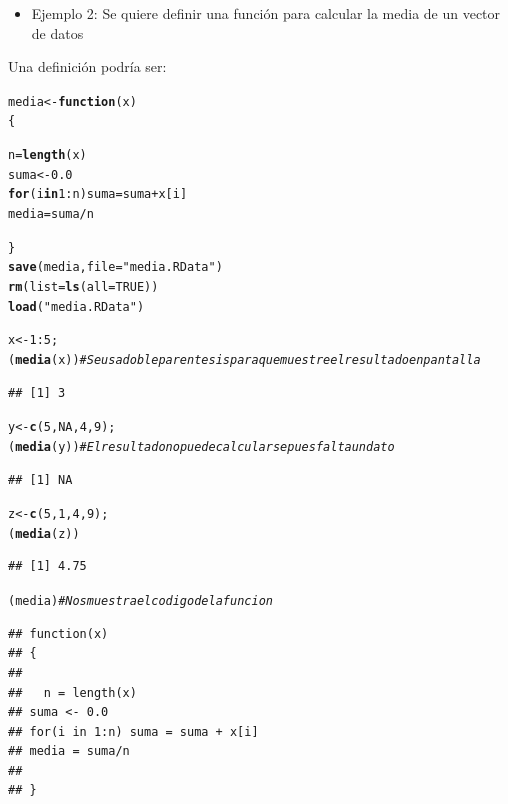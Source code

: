 \documentclass[12pt,letterpaper]{article}\usepackage[]{graphicx}\usepackage[]{color}
\makeatletter
\newcommand{\hlnum}[1]{\textcolor[rgb]{0.686,0.059,0.569}{#1}}%
\newcommand{\hlstr}[1]{\textcolor[rgb]{0.192,0.494,0.8}{#1}}%
\newcommand{\hlcom}[1]{\textcolor[rgb]{0.678,0.584,0.686}{\textit{#1}}}%
\newcommand{\hlopt}[1]{\textcolor[rgb]{0,0,0}{#1}}%
\newcommand{\hlstd}[1]{\textcolor[rgb]{0.345,0.345,0.345}{#1}}%
\newcommand{\hlkwa}[1]{\textcolor[rgb]{0.161,0.373,0.58}{\textbf{#1}}}%
\newcommand{\hlkwb}[1]{\textcolor[rgb]{0.69,0.353,0.396}{#1}}%
\newcommand{\hlkwc}[1]{\textcolor[rgb]{0.333,0.667,0.333}{#1}}%
\newcommand{\hlkwd}[1]{\textcolor[rgb]{0.737,0.353,0.396}{\textbf{#1}}}%
\newenvironment{kframe}{%
 \def\at@end@of@kframe{}%
 \ifinner\ifhmode%
  \def\at@end@of@kframe{\end{minipage}}%
  \begin{minipage}{\columnwidth}%
 \fi\fi%
 \def\FrameCommand##1{\hskip\@totalleftmargin \hskip-\fboxsep
 \colorbox{shadecolor}{##1}\hskip-\fboxsep
     \hskip-\linewidth \hskip-\@totalleftmargin \hskip\columnwidth}%
 \MakeFramed {\advance\hsize-\width
   \@totalleftmargin\z@ \linewidth\hsize
   \@setminipage}}%
 {\par\unskip\endMakeFramed%
 \at@end@of@kframe}
\newenvironment{knitrout}{}{} %
\makeatother
\begin{document}
\begin{itemize}
\item Ejemplo 2: Se quiere definir una funci\'on para calcular la media de un vector de datos
\end {itemize}
Una definici\'on podr\'ia ser:
\begin{knitrout}
\color{fgcolor}\begin{kframe}
\begin{alltt}
\hlstd{media} \hlkwb{<-} \hlkwa{function}\hlstd{(}\hlkwc{x}\hlstd{)}
\hlstd{\{}

  \hlstd{n} \hlkwb{=} \hlkwd{length}\hlstd{(x)}
\hlstd{suma} \hlkwb{<-} \hlnum{0.0}
\hlkwa{for}\hlstd{(i} \hlkwa{in} \hlnum{1}\hlopt{:}\hlstd{n) suma} \hlkwb{=} \hlstd{suma} \hlopt{+} \hlstd{x[i]}
\hlstd{media} \hlkwb{=} \hlstd{suma}\hlopt{/}\hlstd{n}

\hlstd{\}}
\hlkwd{save}\hlstd{(media,} \hlkwc{file}\hlstd{=} \hlstr{"media.RData"}\hlstd{)}
\hlkwd{rm}\hlstd{(}\hlkwc{list}\hlstd{=}\hlkwd{ls}\hlstd{(}\hlkwc{all}\hlstd{=}\hlnum{TRUE}\hlstd{))}
\hlkwd{load}\hlstd{(}\hlstr{"media.RData"}\hlstd{)}

\hlstd{x} \hlkwb{<-} \hlnum{1}\hlopt{:}\hlnum{5}\hlstd{;}
\hlstd{(}\hlkwd{media}\hlstd{(x))} \hlcom{# Se usa doble parentesis para que muestre el resultado en pantalla}
\end{alltt}
\begin{verbatim}
## [1] 3
\end{verbatim}
\begin{alltt}
\hlstd{y} \hlkwb{<-} \hlkwd{c}\hlstd{(}\hlnum{5}\hlstd{,} \hlnum{NA} \hlstd{,} \hlnum{4}\hlstd{,} \hlnum{9}\hlstd{);}
\hlstd{(}\hlkwd{media}\hlstd{(y))} \hlcom{# El resultado no puede calcularse pues falta un dato}
\end{alltt}
\begin{verbatim}
## [1] NA
\end{verbatim}
\begin{alltt}
\hlstd{z} \hlkwb{<-} \hlkwd{c}\hlstd{(}\hlnum{5}\hlstd{,} \hlnum{1} \hlstd{,} \hlnum{4}\hlstd{,} \hlnum{9}\hlstd{);}
\hlstd{(}\hlkwd{media}\hlstd{(z))}
\end{alltt}
\begin{verbatim}
## [1] 4.75
\end{verbatim}
\begin{alltt}
\hlstd{(media)} \hlcom{# Nos muestra el codigo de la funcion}
\end{alltt}
\begin{verbatim}
## function(x)
## {
## 
##   n = length(x)
## suma <- 0.0
## for(i in 1:n) suma = suma + x[i]
## media = suma/n
## 
## }
\end{verbatim}
\end{kframe}
\end{knitrout}
\end{document}
